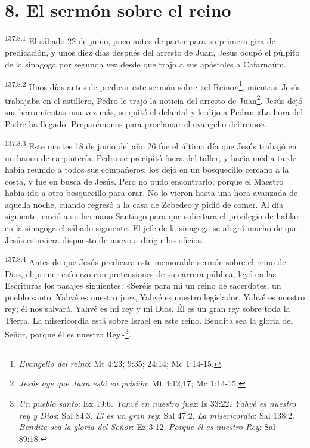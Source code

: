 \section*{8. El sermón sobre el reino}
\par
\textsuperscript{137:8.1} El sábado 22 de junio, poco antes de partir para su primera gira de predicación, y unos diez días después del arresto de Juan, Jesús ocupó el púlpito de la sinagoga por segunda vez desde que trajo a sus apóstoles a Cafarnaúm.

\par
\textsuperscript{137:8.2} Unos días antes de predicar este sermón sobre «el Reino»\footnote{\textit{Evangelio del reino}: Mt 4:23; 9:35; 24:14; Mc 1:14-15.}, mientras Jesús trabajaba en el astillero, Pedro le trajo la noticia del arresto de Juan\footnote{\textit{Jesús oye que Juan está en prisión}: Mt 4:12,17; Mc 1:14-15.}. Jesús dejó sus herramientas una vez más, se quitó el delantal y le dijo a Pedro: «La hora del Padre ha llegado. Preparémonos para proclamar el evangelio del reino».

\par
\textsuperscript{137:8.3} Este martes 18 de junio del año 26 fue el último día que Jesús trabajó en un banco de carpintería. Pedro se precipitó fuera del taller, y hacia media tarde había reunido a todos sus compañeros; los dejó en un bosquecillo cercano a la costa, y fue en busca de Jesús. Pero no pudo encontrarlo, porque el Maestro había ido a otro bosquecillo para orar. No lo vieron hasta una hora avanzada de aquella noche, cuando regresó a la casa de Zebedeo y pidió de comer. Al día siguiente, envió a su hermano Santiago para que solicitara el privilegio de hablar en la sinagoga el sábado siguiente. El jefe de la sinagoga se alegró mucho de que Jesús estuviera dispuesto de nuevo a dirigir los oficios.

\par
\textsuperscript{137:8.4} Antes de que Jesús predicara este memorable sermón sobre el reino de Dios, el primer esfuerzo con pretensiones de su carrera pública, leyó en las Escrituras los pasajes siguientes: «Seréis para mí un reino de sacerdotes, un pueblo santo. Yahvé es nuestro juez, Yahvé es nuestro legislador, Yahvé es nuestro rey; él nos salvará. Yahvé es mi rey y mi Dios. Él es un gran rey sobre toda la Tierra. La misericordia está sobre Israel en este reino. Bendita sea la gloria del Señor, porque él es nuestro Rey»\footnote{\textit{Un pueblo santo}: Ex 19:6. \textit{Yahvé en nuestro juez}: Is 33:22. \textit{Yahvé es nuestro rey y Dios}: Sal 84:3. \textit{Él es un gran rey}: Sal 47:2. \textit{La misericordia}: Sal 138:2. \textit{Bendita sea la gloria del Señor}: Ez 3:12. \textit{Porque él es nuestro Rey}: Sal 89:18.}.

